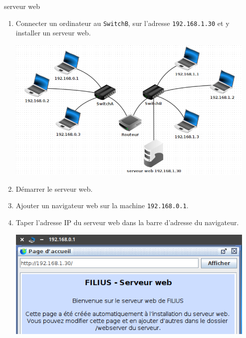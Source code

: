 \documentclass[a4paper,dvipsnames]{article}
\begin{document}
\medskip

\begin{activite}[breakable]{serveur web}{}
  \begin{enumerate}
    \item Connecter un ordinateur au \texttt{SwitchB}, sur l'adresse \texttt{192.168.1.30} et y installer un serveur web.

      \begin{center}
	\includegraphics[width=12cm]{img/serveurweb.png}
      \end{center}

    \item Démarrer le serveur web.
    \item Ajouter un navigateur web sur la machine \texttt{192.168.0.1}. 
    \item Taper l'adresse IP du serveur web dans la barre d'adresse du navigateur.

      \begin{center}
	\includegraphics[width=12cm]{img/nav1.png} 
      \end{center}
  \end{enumerate}
\end{activite}

\medskip
\end{document}
